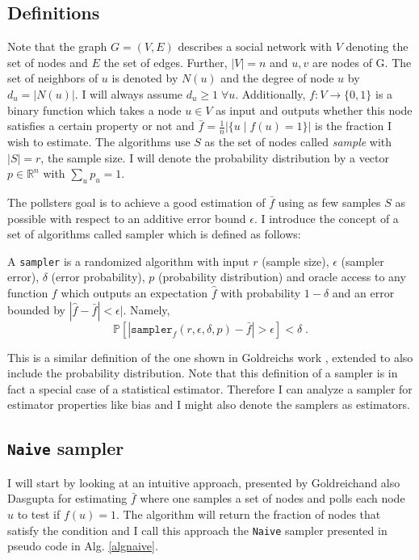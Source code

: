 \label{algorithms}
\subsection{Definitions}
Note that the graph $G = (V,E)$ describes a social network with $V$ denoting the set of nodes and $E$ the set of edges. Further, $|V| = n$ and $u,v$ are nodes of G. The set of neighbors of $u$ is denoted by $N(u)$ and the degree of node $u$ by $d_u=|N(u)|$. I will always assume $d_u\geq1\;\forall u$. Additionally, $f : V \rightarrow \{0,1\}$ is a binary function which takes a node $u \in V$ as input and outputs whether this node satisfies a certain property or not and $\bar{f} = \frac{1}{n}|\{u\;|\;f(u) = 1\}|$ is the fraction I wish to estimate.
The algorithms use $S$ as the set of nodes called \textit{sample} with $|S| = r$, the sample size.
I will denote the probability distribution by a vector $p \in \mathbb{R}^n$ with $\sum_up_u = 1$.

The pollsters goal is to achieve a good estimation of $\bar{f}$ using as few samples $S$ as possible with respect to an additive error bound $\epsilon$.
I introduce the concept of a set of algorithms called sampler which is defined as follows:
\begin{definition}[sampler]
\label{defsampler}
  A \texttt{sampler} is a randomized algorithm with input $r$ (sample size), $\epsilon$ (sampler error), $\delta$ (error probability), $p$ (probability distribution) and oracle access to any function $f$ which outputs an expectation $\hat{f}$ with probability $1-\delta$ and an error bounded by $|\hat{f}-\bar{f}|<\epsilon|$. Namely,
  $$\mathds{P}[|\texttt{sampler}_f(r,\epsilon,\delta,p)-\bar{f} | > \epsilon] < \delta \;.$$
\end{definition}
This is a similar definition of the one shown in Goldreichs work \cite{goldreich1997sample}, extended to also include the probability distribution. 
Note that this definition of a sampler is in fact a special case of a statistical estimator.
Therefore I can analyze a sampler for estimator properties like bias and I might also denote the samplers as estimators.

\subsection{\texttt{Naive} sampler}
I will start by looking at an intuitive approach, presented by Goldreich\cite{goldreich1997sample}and also Dasgupta\cite{dasgupta2012social} for estimating $\bar{f}$ where one samples a set of nodes and polls each node $u$ to test if $f(u)=1$.
The algorithm will return the fraction of nodes that satisfy the condition and I call this approach the \texttt{Naive} sampler presented in pseudo code in Alg. \ref{algnaive}.

